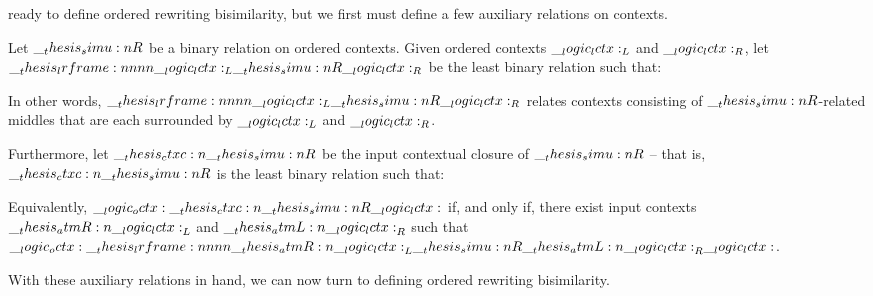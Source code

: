  ready to define ordered rewriting bisimilarity, but we first must define a few auxiliary relations on contexts.
%
\begin{definition}\label{def:ordered-bisimilarity:framed-relation}
  Let $\__thesis_simu:n {R}$ be a binary relation on ordered contexts.
  Given ordered contexts $\__logic_lctx:_L$ and $\__logic_lctx:_R$, let $\lrframe{\lctx_L}{\simu{R}}{\lctx_R}$ be the least binary relation such that:
  \begin{inferences}
  \end{inferences}
  In other words, $\lrframe{\lctx_L}{\simu{R}}{\lctx_R}$ relates contexts consisting of $\__thesis_simu:n {R}$-related middles that are each surrounded by $\__logic_lctx:_L$ and $\__logic_lctx:_R$.

  Furthermore, let $\ctxc{\simu{R}}$ be the input contextual closure of $\__thesis_simu:n {R}$ -- that is, $\ctxc{\simu{R}}$ is the least binary relation such that:
  Equivalently, $\octx \ctxc{\simu{R}} \lctx$ if, and only if, there exist input contexts $\__thesis_atmR:n {\__logic_lctx:}_L$ and $\__thesis_atmL:n {\__logic_lctx:}_R$ such that $\octx \lrframe{\atmR{\lctx}_L}{\simu{R}}{\atmL{\lctx}_R} \lctx$.
\end{definition}
\noindent
With these auxiliary relations in hand, we can now turn to defining ordered rewriting bisimilarity.
%
